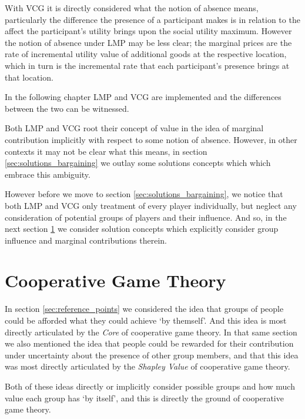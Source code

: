 With VCG it is directly considered what the notion of absence means, particularly the difference the presence of a participant makes is in relation to the affect the participant's utility brings upon the social utility maximum.
However the notion of absence under LMP may be less clear; the marginal prices are the rate of incremental utility value of additional goods at the respective location, which in turn is the incremental rate that each participant's presence brings at that location.

In the following chapter LMP and VCG are implemented and the differences between the two can be witnessed.

Both LMP and VCG root their concept of value in the idea of marginal contribution implicitly with respect to some notion of absence. However, in other contexts it may not be clear what this means, in section \ref{sec:solutions_bargaining} we outlay some solutions concepts which which embrace this ambiguity.

However before we move to section \ref{sec:solutions_bargaining}, we notice that both LMP and VCG only treatment of every player individually, but neglect any consideration of potential groups of players and their influence.
And so, in the next section \ref{sec:cooperative_game_theory_part} we consider solution concepts which explicitly consider group influence and marginal contributions therein.



\section{Cooperative Game Theory}\label{sec:cooperative_game_theory_part}

In section \ref{sec:reference_points} we considered the idea that groups of people could be afforded what they could achieve `by themself'.
And this idea is most directly articulated by the \textit{Core} of cooperative game theory.
In that same section we also mentioned the idea that people could be rewarded for their contribution under uncertainty about the presence of other group members, and that this idea was most directly articulated by the \textit{Shapley Value} of cooperative game theory.

Both of these ideas directly or implicitly consider possible groups and how much value each group has `by itself', and this is directly the ground of cooperative game theory.

